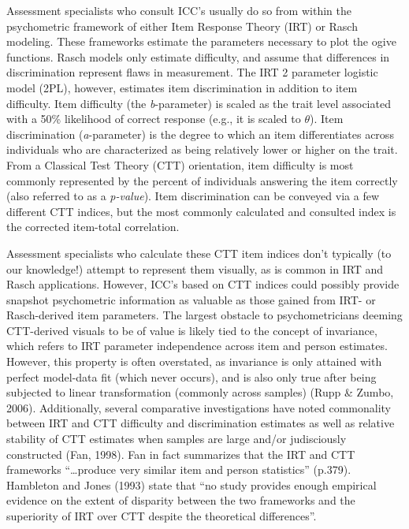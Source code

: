 \documentclass[
  man]{apa6}
\begin{document}
Assessment specialists who consult ICC's usually do so from within the psychometric framework of either Item Response Theory (IRT) or Rasch modeling. These frameworks estimate the parameters necessary to plot the ogive functions. Rasch models only estimate difficulty, and assume that differences in discrimination represent flaws in measurement. The IRT 2 parameter logistic model (2PL), however, estimates item discrimination in addition to item difficulty. Item difficulty (the \emph{b}-parameter) is scaled as the trait level associated with a 50\% likelihood of correct response (e.g., it is scaled to \(\theta\)). Item discrimination (\emph{a}-parameter) is the degree to which an item differentiates across individuals who are characterized as being relatively lower or higher on the trait. From a Classical Test Theory (CTT) orientation, item difficulty is most commonly represented by the percent of individuals answering the item correctly (also referred to as a \emph{p-value}). Item discrimination can be conveyed via a few different CTT indices, but the most commonly calculated and consulted index is the corrected item-total correlation.

Assessment specialists who calculate these CTT item indices don't typically (to our knowledge!) attempt to represent them visually, as is common in IRT and Rasch applications. However, ICC's based on CTT indices could possibly provide snapshot psychometric information as valuable as those gained from IRT- or Rasch-derived item parameters. The largest obstacle to psychometricians deeming CTT-derived visuals to be of value is likely tied to the concept of invariance, which refers to IRT parameter independence across item and person estimates. However, this property is often overstated, as invariance is only attained with perfect model-data fit (which never occurs), and is also only true after being subjected to linear transformation (commonly across samples) (Rupp \& Zumbo, 2006). Additionally, several comparative investigations have noted commonality between IRT and CTT difficulty and discrimination estimates as well as relative stability of CTT estimates when samples are large and/or judisciously constructed (Fan, 1998). Fan in fact summarizes that the IRT and CTT frameworks ``\ldots produce very similar item and person statistics'' (p.379). Hambleton and Jones (1993) state that ``no study provides enough empirical evidence on the extent of disparity between the two frameworks and the superiority of IRT over CTT despite the theoretical differences''.
\end{document}
